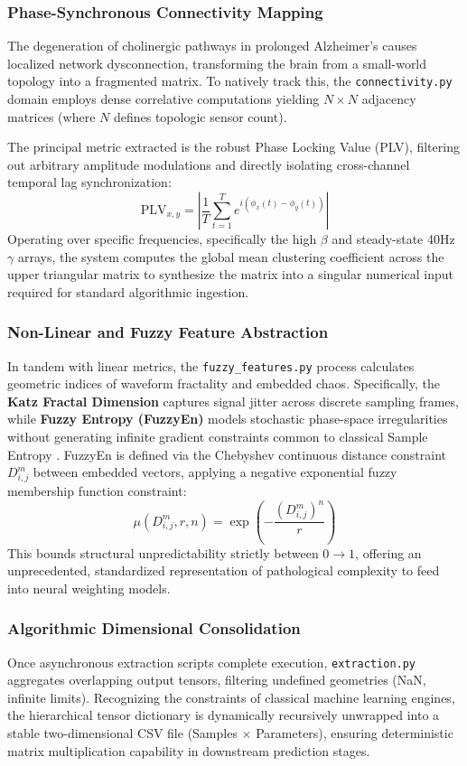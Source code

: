 \subsubsection{Phase-Synchronous Connectivity Mapping}
The degeneration of cholinergic pathways in prolonged Alzheimer's causes localized network dysconnection, transforming the brain from a small-world topology into a fragmented matrix. To natively track this, the \texttt{connectivity.py} domain employs dense correlative computations yielding $N \times N$ adjacency matrices (where $N$ defines topologic sensor count).

The principal metric extracted is the robust Phase Locking Value (PLV), filtering out arbitrary amplitude modulations and directly isolating cross-channel temporal lag synchronization:
\begin{equation}
    \text{PLV}_{x,y} = \left| \frac{1}{T} \sum_{t=1}^{T} e^{i(\phi_x(t) - \phi_y(t))} \right|
\end{equation}
Operating over specific frequencies, specifically the high $\beta$ and steady-state 40Hz $\gamma$ arrays, the system computes the global mean clustering coefficient across the upper triangular matrix to synthesize the matrix into a singular numerical input required for standard algorithmic ingestion. 

\subsubsection{Non-Linear and Fuzzy Feature Abstraction}
In tandem with linear metrics, the \texttt{fuzzy\_features.py} process calculates geometric indices of waveform fractality and embedded chaos. Specifically, the \textbf{Katz Fractal Dimension} captures signal jitter across discrete sampling frames, while \textbf{Fuzzy Entropy (FuzzyEn)} models stochastic phase-space irregularities without generating infinite gradient constraints common to classical Sample Entropy \cite{stam2007graph}. 
FuzzyEn is defined via the Chebyshev continuous distance constraint $D_{i,j}^m$ between embedded vectors, applying a negative exponential fuzzy membership function constraint:
\begin{equation}
    \mu(D_{i,j}^m, r, n) = \exp \left(-\frac{(D_{i,j}^m)^n}{r} \right)
\end{equation}
This bounds structural unpredictability strictly between $0 \to 1$, offering an unprecedented, standardized representation of pathological complexity to feed into neural weighting models.

\subsubsection{Algorithmic Dimensional Consolidation}
Once asynchronous extraction scripts complete execution, \texttt{extraction.py} aggregates overlapping output tensors, filtering undefined geometries (NaN, infinite limits). Recognizing the constraints of classical machine learning engines, the hierarchical tensor dictionary is dynamically recursively unwrapped into a stable two-dimensional CSV file (Samples $\times$ Parameters), ensuring deterministic matrix multiplication capability in downstream prediction stages.
